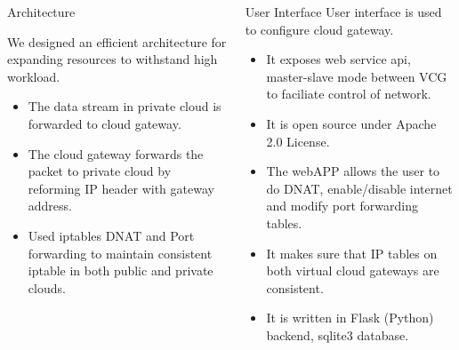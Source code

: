 \documentclass[final]{beamer}
\newlength{\onecolwid}
\newlength{\twocolwid}
\begin{document}
\begin{frame}[t]
\begin{columns}[t]
\begin{column}{\twocolwid}
\begin{columns}[t,totalwidth=\twocolwid]
\begin{column}{\onecolwid}

\begin{block}{Architecture}

We designed an efficient architecture for expanding resources to withstand high workload.

\begin{itemize}
\item The data stream in private cloud is forwarded to cloud gateway.
\item The cloud gateway forwards the packet to private cloud by reforming IP header with gateway address.
\item Used iptables DNAT and Port forwarding to maintain consistent iptable in both public and private clouds.
\end{itemize}



\end{block}


\end{column} %

\begin{column}{\onecolwid}\vspace{-.6in} %


\begin{block}{User Interface}
User interface is used to configure cloud gateway.
\begin{itemize}
\item It exposes web service api, master-slave mode between VCG to faciliate control of network.
\item It is open source under Apache 2.0 License.
\item The webAPP allows the user to do DNAT, enable/disable internet and modify port forwarding tables.
\item It makes sure that IP tables on both virtual cloud gateways are consistent. 
\item It is written in Flask (Python) backend, sqlite3 database.
\end{itemize}


\end{block}
\end{column}
\end{columns}
\end{column}
\end{columns}
\end{frame}
\end{document}
